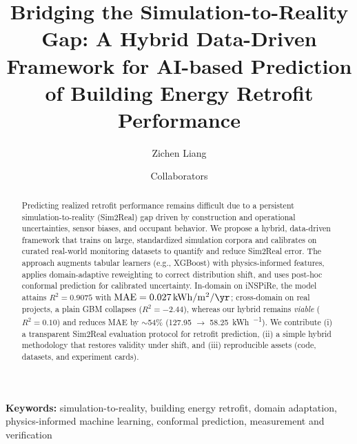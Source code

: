 ﻿\documentclass{article}
\title{Bridging the Simulation-to-Reality Gap: A Hybrid Data-Driven Framework for AI-based Prediction of Building Energy Retrofit Performance}
\author{Zichen Liang \and Collaborators}
\date{}
\begin{document}
\maketitle

\begin{abstract}
Predicting realized retrofit performance remains difficult due to a persistent simulation-to-reality (Sim2Real) gap driven by construction and operational uncertainties, sensor biases, and occupant behavior. We propose a hybrid, data-driven framework that trains on large, standardized simulation corpora and calibrates on curated real-world monitoring datasets to quantify and reduce Sim2Real error. The approach augments tabular learners (e.g., XGBoost) with physics-informed features, applies domain-adaptive reweighting to correct distribution shift, and uses post-hoc conformal prediction for calibrated uncertainty. In-domain on iNSPiRe, the model attains $R^2=0.9075$ with $\mathrm{MAE}=\SI{0.027}{\kWh\per\square\metre\per\yr}$; cross-domain on real projects, a plain GBM collapses ($R^2=-2.44$), whereas our hybrid remains \emph{viable} ($R^2=0.10$) and reduces MAE by $\sim$54\% (127.95 $\rightarrow$ 58.25~\si{\kWh\per\month}). We contribute (i) a transparent Sim2Real evaluation protocol for retrofit prediction, (ii) a simple hybrid methodology that restores validity under shift, and (iii) reproducible assets (code, datasets, and experiment cards).
\end{abstract}

\noindent\textbf{Keywords:} simulation-to-reality, building energy retrofit, domain adaptation, physics-informed machine learning, conformal prediction, measurement and verification
\end{document}
